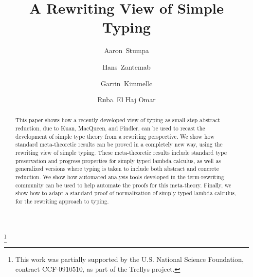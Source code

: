 \documentclass{LMCS}
\begin{document}
\title[A Rewriting View of Simple Typing]{A Rewriting View of Simple Typing}


\author[A.~Stump]{Aaron~Stump\rsuper a}
\address{{}Computer Science, The University of Iowa}

\author[H.~Zantema]{Hans~Zantema\rsuper b}
\address{{\lsuper b}Department of Computer Science, TU Eindhoven, The Netherlands; and Institute for Computing and Information Sciences, Radboud University, The Netherlands}

\author[G.~Kimmell]{Garrin~Kimmell\rsuper c}
\address{ pt}

\author[R.~ El Haj Omar]{Ruba~El Haj Omar}
\address{ pt}

\thanks{This work was
    partially supported by the U.S. National Science Foundation, contract
    CCF-0910510, as part of the Trellys project.}




\newtheorem{theorem}[thm]{Theorem}
\newtheorem{lemma}[thm]{Lemma}
\newtheorem{corollary}[thm]{Corollary}
\newtheorem{definition}[thm]{Definition}
\newtheorem{proposition}[thm]{Proposition}
\newtheorem*{theorema}{Theorem}


\begin{abstract}
This paper shows how a recently developed view of typing as small-step
abstract reduction, due to Kuan, MacQueen, and Findler, can be used to
recast the development of simple type theory from a rewriting
perspective.  We show how standard meta-theoretic results can be
proved in a completely new way, using the rewriting view of simple
typing.  These meta-theoretic results include standard type
preservation and progress properties for simply typed lambda calculus,
as well as generalized versions where typing is taken to include both
abstract and concrete reduction.  We show how automated analysis tools
developed in the term-rewriting community can be used to help automate
the proofs for this meta-theory.  Finally, we show how to adapt a
standard proof of normalization of simply typed lambda calculus, for
the rewriting approach to typing.
\end{abstract}

\maketitle
\end{document}
